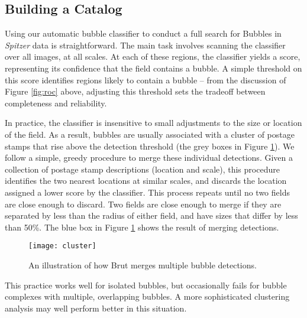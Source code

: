 \documentclass[preprint]{aastex}
\begin{document}
\subsection{Building a Catalog}
\label{sec:build}

Using our automatic bubble classifier to conduct a full search for Bubbles in \textit{Spitzer} data is straightforward. The main task involves scanning the classifier over all images, at all scales. At each of these regions, the classifier yields a score, representing its confidence that the field contains a bubble. A simple threshold on this score identifies regions likely to contain a bubble -- from the discussion of Figure \ref{fig:roc} above, adjusting this threshold sets the tradeoff between completeness and reliability. 

In practice, the classifier is insensitive to small adjustments to the size or location of the field. As a result, bubbles are usually associated with a cluster of postage stamps that rise above the detection threshold (the grey boxes in Figure \ref{fig:cluster}). We follow a simple, greedy procedure to merge these individual detections. Given a collection of postage stamp descriptions (location and scale), this procedure identifies the two nearest locations at similar scales, and discards the location assigned a lower score by the classifier. This process repeats until no two fields are close enough to discard. Two fields are close enough to merge if they are separated by less than the radius of either field, and have sizes that differ by less than 50\%. The blue box in Figure \ref{fig:cluster} shows the result of merging detections.

\begin{figure}[h!]
\texttt{[image: cluster]}
\caption{An illustration of how Brut merges multiple bubble detections.}
\label{fig:cluster}
\end{figure}
 
 
This practice works well for isolated bubbles, but occasionally fails for bubble complexes with multiple, overlapping bubbles. A more sophisticated clustering analysis may well perform better in this situation.
\end{document}
